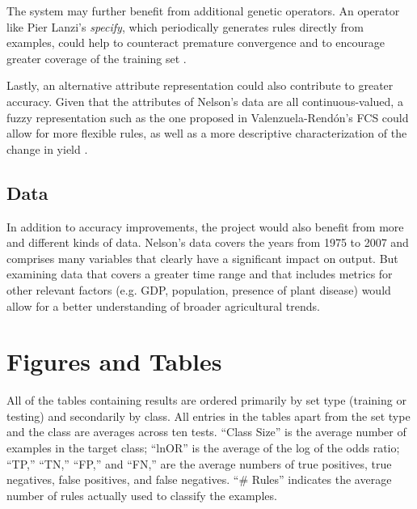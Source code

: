 \documentclass[11pt]{article}
\begin{document}
The system may further benefit from additional genetic operators. An operator like Pier Lanzi's \emph{specify}, which periodically generates rules directly from examples, could help to counteract premature convergence and to encourage greater coverage of the training set \cite{lanzi_study_1997}.

Lastly, an alternative attribute representation could also contribute to greater accuracy. Given that the attributes of Nelson's data are all continuous-valued, a fuzzy representation such as the one proposed in 
Valenzuela-Rend\'on's FCS could allow for more flexible rules, as well as a more descriptive characterization of the change in yield \cite{manuel_valenzuela-rendon_fuzzy_1991}.

\subsection{Data}

In addition to accuracy improvements, the project would also benefit from more and different kinds of data. Nelson's data covers the years from 1975 to 2007 and comprises many variables that clearly have a significant impact on output. But examining data that covers a greater time range and that includes metrics for other relevant factors (e.g. GDP, population, presence of plant disease) would allow for a better understanding of broader agricultural trends.

\section{Figures and Tables}

All of the tables containing results are ordered primarily by set type (training or testing) and secondarily by class. All entries in the tables apart from the set type and the class are averages across ten tests. ``Class Size'' is the average number of examples in the target class; ``lnOR'' is the average of the log of the odds ratio; ``TP,'' ``TN,'' ``FP,'' and ``FN,'' are the average numbers of true positives, true negatives, false positives, and false negatives. ``\# Rules'' indicates the average number of rules actually used to classify the examples.
\end{document}
